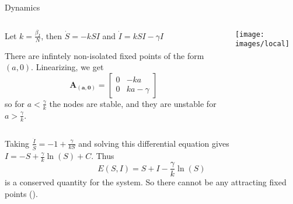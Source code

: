 \begin{slide}{Dynamics}

\begin{columns}[T]
	\begin{column}{.7\textwidth}
		Let $k = \frac{\beta_I}{N}$, then $\dot{S} = -k S I$ and $\dot{I} = k S I - \gamma I$

		There are infintely non-isolated fixed points of the form $(a,0)$.
		Linearizing, we get
		$$\mathbf{A_{(a,0)}} = \begin{bmatrix} 0 & -k a \\ 0 & k a - \gamma \end{bmatrix}$$
		so for $a < \frac{\gamma}{k}$ the nodes are stable, and they are unstable for $a > \frac{\gamma}{k}$.
	\end{column}
	\begin{column}{.25\textwidth}
		\centering
		\texttt{[image: images/local]}
	\end{column}
\end{columns}
Taking $\frac{\dot{I}}{\dot{S}} = -1 + \frac{\gamma}{k S}$ and solving this differential equation gives $I = - S + \frac{\gamma}{k} \ln (S) + C$.
Thus
$$E(S,I) = S + I - \frac{\gamma}{k} \ln (S)$$
is a conserved quantity for the system.
So there cannot be any attracting fixed points (\cite{strogatz:2000}).
\end{slide}
